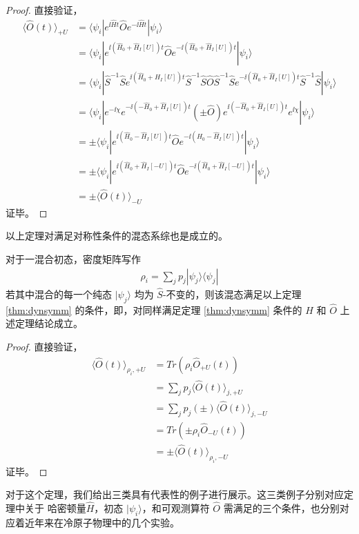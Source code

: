 \begin{proof}
直接验证，
\begin{align}
\langle \hat{O}(t)\rangle_{+U}&=\langle\psi_i|e^{\ii \hat{H}t}\hat{O}e^{-\ii \hat{H}t}|\psi_i\rangle\\
&=\langle\psi_i|e^{\ii (\hat{H}_0+\hat{H}_I[U])t}\hat{O}e^{-\ii (\hat{H}_0+\hat{H}_I[U])t}|\psi_i\rangle\\
&=\langle\psi_i|\hat{S}^{-1}\hat{S}e^{\ii (\hat{H}_0+\hat{H}_I[U])t}\hat{S}^{-1}\hat{S}\hat{O}\hat{S}^{-1}\hat{S}e^{-\ii (\hat{H}_0+\hat{H}_I[U])t}\hat{S}^{-1}\hat{S}|\psi_i\rangle\\
&=\langle\psi_i|e^{-\ii\chi}e^{-\ii (-\hat{H}_0+\hat{H}_I[U])t}(\pm \hat{O})e^{\ii (-\hat{H}_0+\hat{H}_I[U])t}e^{\ii\chi}|\psi_i\rangle\\
&=\pm\langle\psi_i|e^{\ii (\hat{H}_0-\hat{H}_I[U])t}\hat{O}e^{-\ii (\hat{H}_0-\hat{H}_I[U])t}|\psi_i\rangle\\
&=\pm\langle\psi_i|e^{\ii (\hat{H}_0+\hat{H}_I[-U])t}\hat{O}e^{-\ii (\hat{H}_0+\hat{H}_I[-U])t}|\psi_i\rangle\\
&=\pm\langle \hat{O}(t)\rangle_{-U}
\end{align}
证毕。
\end{proof}

以上定理对满足对称性条件的混态系综也是成立的。

\begin{corollary}
对于一混合初态，密度矩阵写作 
\begin{align}
\rho_i=\sum_jp_j|\psi_j\rangle\langle\psi_j|
\end{align}
若其中混合的每一个纯态 $|\psi_j\rangle$ 均为 $\hat{S}$-不变的，则该混态满足以上定理 \ref{thm:dynsymm} 的条件，即，对同样满足定理 \ref{thm:dynsymm} 条件的 $\hat{H}$ 和 $\hat{O}$ 上述定理结论成立。
\end{corollary}

\begin{proof}
直接验证，
\begin{align}
\langle \hat{O}(t)\rangle_{\rho_i,+U}&=Tr(\rho_i\hat{O}_{+U}(t))\\
&=\sum_{j}p_j\langle \hat{O}(t)\rangle_{j,+U}\\
&=\sum_jp_j(\pm)\langle \hat{O}(t)\rangle_{j,-U}\\
&=Tr(\pm\rho_i\hat{O}_{-U}(t))\\
&=\pm \langle \hat{O}(t)\rangle_{\rho_i,-U}
\end{align}
证毕。
\end{proof}

对于这个定理，我们给出三类具有代表性的例子进行展示。这三类例子分别对应定理中关于 哈密顿量$\hat{H}$，初态 $|\psi_i\rangle$，和可观测算符 $\hat{O}$ 需满足的三个条件，也分别对应着近年来在冷原子物理中的几个实验\cite{hubbard-expan-2010,hubbard-expan-2012,mbl1d,twobody-2017}。


